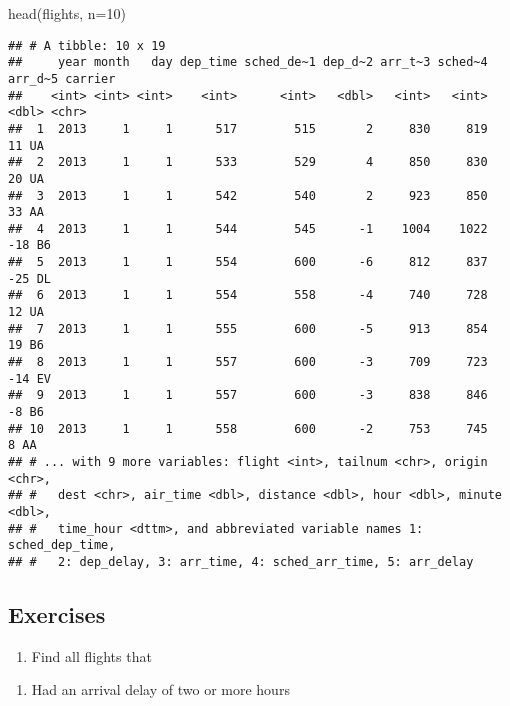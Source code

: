 \documentclass[
]{article}
\newenvironment{Shaded}{\begin{snugshade}}{\end{snugshade}}
\newcommand{\AttributeTok}[1]{\textcolor[rgb]{0.77,0.63,0.00}{#1}}
\newcommand{\DecValTok}[1]{\textcolor[rgb]{0.00,0.00,0.81}{#1}}
\newcommand{\FunctionTok}[1]{\textcolor[rgb]{0.00,0.00,0.00}{#1}}
\newcommand{\NormalTok}[1]{#1}
\providecommand{\tightlist}{%
  \setlength{\itemsep}{0pt}\setlength{\parskip}{0pt}}
\begin{document}
\begin{Shaded}
\begin{Highlighting}[]
\FunctionTok{head}\NormalTok{(flights, }\AttributeTok{n=}\DecValTok{10}\NormalTok{)}
\end{Highlighting}
\end{Shaded}

\begin{verbatim}
## # A tibble: 10 x 19
##     year month   day dep_time sched_de~1 dep_d~2 arr_t~3 sched~4 arr_d~5 carrier
##    <int> <int> <int>    <int>      <int>   <dbl>   <int>   <int>   <dbl> <chr>  
##  1  2013     1     1      517        515       2     830     819      11 UA     
##  2  2013     1     1      533        529       4     850     830      20 UA     
##  3  2013     1     1      542        540       2     923     850      33 AA     
##  4  2013     1     1      544        545      -1    1004    1022     -18 B6     
##  5  2013     1     1      554        600      -6     812     837     -25 DL     
##  6  2013     1     1      554        558      -4     740     728      12 UA     
##  7  2013     1     1      555        600      -5     913     854      19 B6     
##  8  2013     1     1      557        600      -3     709     723     -14 EV     
##  9  2013     1     1      557        600      -3     838     846      -8 B6     
## 10  2013     1     1      558        600      -2     753     745       8 AA     
## # ... with 9 more variables: flight <int>, tailnum <chr>, origin <chr>,
## #   dest <chr>, air_time <dbl>, distance <dbl>, hour <dbl>, minute <dbl>,
## #   time_hour <dttm>, and abbreviated variable names 1: sched_dep_time,
## #   2: dep_delay, 3: arr_time, 4: sched_arr_time, 5: arr_delay
\end{verbatim}

\hypertarget{exercises}{%
\subsection{Exercises}\label{exercises}}

\begin{enumerate}
\def\labelenumi{\arabic{enumi}.}
\tightlist
\item
  Find all flights that
\end{enumerate}

\begin{enumerate}
\def\labelenumi{\alph{enumi})}
\tightlist
\item
  Had an arrival delay of two or more hours
\end{enumerate}
\end{document}
